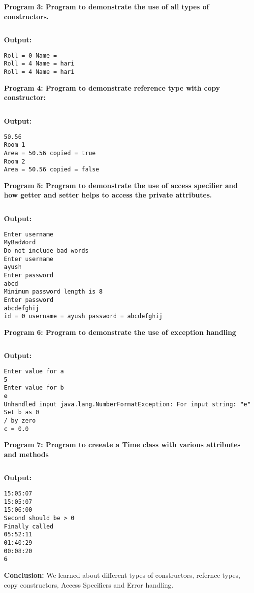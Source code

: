 \documentclass{book}
\begin{document}
\par
\textbf{Program 3: Program to demonstrate the use of all types of constructors.}
\inputminted{java}{AllConstructors.java}
\par
\textbf{Output:}
\begin{verbatim}
Roll = 0 Name =
Roll = 4 Name = hari
Roll = 4 Name = hari 
\end{verbatim}
\par
\textbf{Program 4: Program to demonstrate reference type with copy constructor:}
\inputminted{java}{CopyConstructor.java}
\par
\textbf{Output:}
\begin{verbatim}
50.56
Room 1 
Area = 50.56 copied = true
Room 2
Area = 50.56 copied = false
\end{verbatim}
\par
\textbf{Program 5: Program to demonstrate the use of access specifier and how getter and setter helps to access the private attributes.}
\inputminted{java}{AccessSpecifier.java}
\par
\textbf{Output:}
\begin{verbatim}
Enter username
MyBadWord
Do not include bad words
Enter username
ayush
Enter password
abcd
Minimum password length is 8
Enter password
abcdefghij
id = 0 username = ayush password = abcdefghij
\end{verbatim}
\par
\textbf{Program 6: Program to demonstrate the use of exception handling}
\inputminted{java}{ExceptionHandling.java}
\par
\textbf{Output:}
\begin{verbatim}
Enter value for a
5
Enter value for b
e
Unhandled input java.lang.NumberFormatException: For input string: "e"
Set b as 0
/ by zero
c = 0.0
\end{verbatim}
\par
\textbf{Program 7: Program to creeate a Time class with various attributes and methods}
\\

\inputminted{java}{Lab2.java}
\textbf{Output:}
\begin{verbatim}
15:05:07
15:05:07
15:06:00
Second should be > 0
Finally called
05:52:11
01:40:29
00:08:20
6
\end{verbatim}
\par
\textbf{Conclusion:} We learned about different types of constructors, refernce types, copy constructors, Access Specifiers and Error handling.
\par
\end{document}
